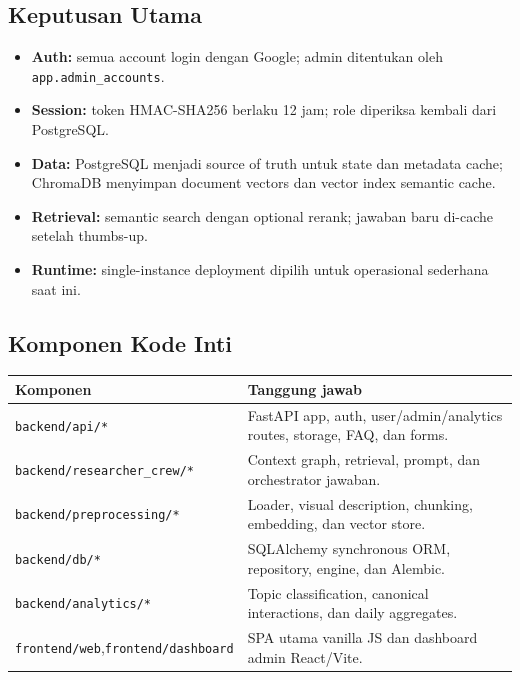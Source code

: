 \documentclass[11pt,a4paper]{article}
\begin{document}
\subsection{Keputusan Utama}
\begin{itemize}
  \item \textbf{Auth:} semua account login dengan Google; admin ditentukan oleh \texttt{app.admin\_accounts}.
  \item \textbf{Session:} token HMAC-SHA256 berlaku 12 jam; role diperiksa kembali dari PostgreSQL.
  \item \textbf{Data:} PostgreSQL menjadi source of truth untuk state dan metadata cache; ChromaDB menyimpan document vectors dan vector index semantic cache.
  \item \textbf{Retrieval:} semantic search dengan optional rerank; jawaban baru di-cache setelah thumbs-up.
  \item \textbf{Runtime:} single-instance deployment dipilih untuk operasional sederhana saat ini.
\end{itemize}

\subsection{Komponen Kode Inti}
\begin{tabularx}{\linewidth}{@{}p{4.8cm}X@{}}
\toprule \textbf{Komponen} & \textbf{Tanggung jawab} \\ \midrule
\texttt{backend/api/*} & FastAPI app, auth, user/admin/analytics routes, storage, FAQ, dan forms. \\
\texttt{backend/}\linebreak\texttt{researcher\_crew/*} & Context graph, retrieval, prompt, dan orchestrator jawaban. \\
\texttt{backend/preprocessing/*} & Loader, visual description, chunking, embedding, dan vector store. \\
\texttt{backend/db/*} & SQLAlchemy synchronous ORM, repository, engine, dan Alembic. \\
\texttt{backend/analytics/*} & Topic classification, canonical interactions, dan daily aggregates. \\
\texttt{frontend/web},\linebreak\texttt{frontend/dashboard} & SPA utama vanilla JS dan dashboard admin React/Vite. \\
\bottomrule
\end{tabularx}
\end{document}
